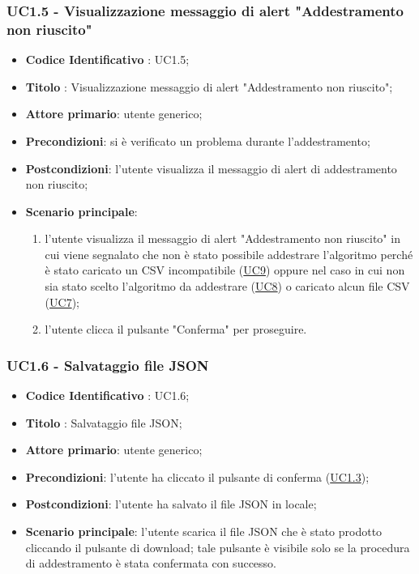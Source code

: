 	\subsubsection{UC1.5 - Visualizzazione messaggio di alert "Addestramento non riuscito"}
		\begin{itemize}
			\item\textbf{Codice Identificativo} : UC1.5;
			\item\textbf{Titolo} : Visualizzazione messaggio di alert "Addestramento non riuscito";
			\item\textbf{Attore primario}: utente generico;
			\item\textbf{Precondizioni}: si è verificato un problema durante l'addestramento;
			\item\textbf{Postcondizioni}: l'utente visualizza il messaggio di alert di addestramento non riuscito;					
			\item\textbf{Scenario principale}:
				\begin{enumerate}
				\item l'utente visualizza il messaggio di alert "Addestramento non riuscito" in cui viene segnalato che non è stato possibile addestrare l'algoritmo perché è stato caricato un CSV incompatibile (\hyperref[par:UC9]{UC9}) oppure nel caso in cui non sia stato scelto l'algoritmo da addestrare (\hyperref[par:UC8]{UC8}) o caricato alcun file CSV (\hyperref[par:UC7]{UC7});
				\item l'utente clicca il pulsante "Conferma" per proseguire.
					
				\end{enumerate}
				
					
				
					
		\end{itemize}

	\label{par:UC1.6}
	\subsubsection{UC1.6 - Salvataggio file JSON}
		\begin{itemize}
			\item\textbf{Codice Identificativo} : UC1.6;
			\item\textbf{Titolo} : Salvataggio file JSON;
			\item\textbf{Attore primario}: utente generico;
			\item\textbf{Precondizioni}: l'utente ha cliccato il pulsante di conferma (\hyperref[par:UC1.3]{UC1.3});
			\item\textbf{Postcondizioni}: l'utente ha salvato il file JSON in locale;
			\item\textbf{Scenario principale}: l'utente scarica il file JSON che è stato prodotto cliccando il pulsante di download; tale pulsante è visibile solo se la procedura di addestramento è stata confermata con successo. 	
			
			 	
		\end{itemize}

